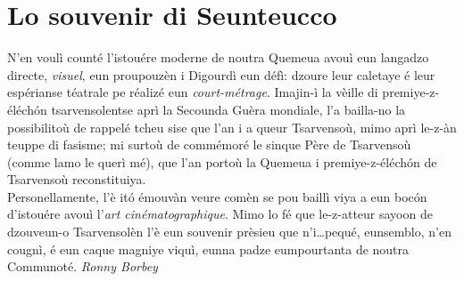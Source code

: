 \section*{Lo souvenir di Seunteucco}
\og N'en voulì counté l'istouére moderne de noutra Quemeua avouì eun langadzo directe, \textit{visuel}, eun proupouzèn i Digourdì eun défì: dzoure leur caletaye é leur espérianse téatrale pe réalizé eun \textit{court-métrage}. Imajin-ì la vèille di premiye-z-éléch\'on tsarvensolentse aprì la Secounda Guèra mondiale, l'a bailla-no la possibilitoù de rappelé tcheu sise que l'an i a queur Tsarvensoù, mimo aprì le-z-àn teuppe di fasisme; mi surtoù de commémoré le sinque Père de Tsarvensoù (comme lamo le querì mé), que l'an portoù la Quemeua i premiye-z-éléch\'on de Tsarvensoù reconstituiya.
\\Personellamente, l'è it\'o émouvàn veure comèn se pou baillì viya a eun boc\'on d'istouére avouì l'\textit{art cinématographique}. Mimo lo fé que le-z-atteur sayoon de dzouveun-o Tsarvensolèn l'è eun souvenir prèsieu que n'i\ldots pequé, eunsemblo, n'en cougnì, é eun caque magniye viquì, eunna padze eumpourtanta de noutra Communoté.
\fg{}
\newline
\newline
\hspace*{\fill} \textit{Ronny Borbey}

%
